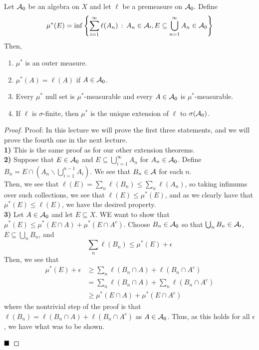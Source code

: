 \begin{theorem}
    Let $\cal{A}_0$ be an algebra on $X$ and let $\ell$ be a premeasure on $\cal{A}_0$. Define
    \[ \mu^{*}(E) = \inf\left\{\sum_{i = 1}^{\infty} \ell(A_n) \col A_n \in \cal{A_0}, E \subseteq \bigcup_{n = 1}^{\infty} A_n \in \cal{A}_0\right\} \]
    Then,
    \begin{enumerate}
        \item $\mu^{*}$ is an outer measure.
        \item $\mu^{*}(A) = \ell(A)$ if $A \in \cal{A}_0$.
        \item Every $\mu^{*}$ null set is $\mu^{*}$-measurable and every $A \in \cal{A}_0$ is $\mu^{*}$-measurable.
        \item If $\ell$ is $\sigma$-finite, then $\mu^{*}$ is the unique extension of $\ell$ to $\sigma(\cal{A}_0)$.
    \end{enumerate}
\end{theorem}
\begin{proof}{Proof:}
    In this lecture we will prove the first three statements, and we will prove the fourth one in the next lecture.\\

    \textbf{1)} This is the same proof as for our other extension theorems.\\

    \textbf{2)} Suppose that $E \in \cal{A}_0$ and $E \subseteq \bigcup_{i =1}^{\infty} A_n$ for $A_n \in \cal{A}_0$. Define $B_n = E \cap \left(A_n \backslash \bigcup_{i = 1}^{n - 1} A_i\right)$. We see that $B_n \in \cal{A}$ for each $n$.\\

    Then, we see that $\ell(E) = \sum_{n} \ell(B_n) \leq \sum_{n} \ell(A_n)$, so taking infimums over such collections, we see that $\ell(E) \leq \mu^{*}(E)$, and as we clearly have that $\mu^{*}(E) \leq \ell(E)$, we have the desired property.\\

    \textbf{3)} Let $A \in \cal{A}_0$ and let $E \subseteq X$. WE want to show that $\mu^{*}(E) \leq \mu^{*}(E \cap A) + \mu^{*}(E \cap A^{c})$. Choose $B_n \in \cal{A}_0$ so that $\bigcup_{n} B_n \in \cal{A_0}$, $E \subseteq \bigcup_{n} B_n$, and
    \[ \sum_{n} \ell(B_n) \leq \mu^{*}(E) + \epsilon \]
    Then, we see that
    \begin{align*}
        \mu^{*}(E) + \epsilon &\geq \sum_{n} \ell(B_n \cap A) + \ell(B_n \cap A^{c})\\
        &= \sum_{n} \ell(B_n \cap A) + \sum_{n} \ell(B_n \cap A^{c})\\
        &\geq \mu^{*}(E \cap A) + \mu^{*}(E \cap A^{c})
    \end{align*}
    where the nontrivial step of the proof is that $\ell(B_n) = \ell(B_n \cap A) + \ell(B_n \cap A^{c})$ as $A \in \cal{A}_0$. Thus, as this holds for all $\epsilon$, we have what was to be shown.

    $\qed$
\end{proof}